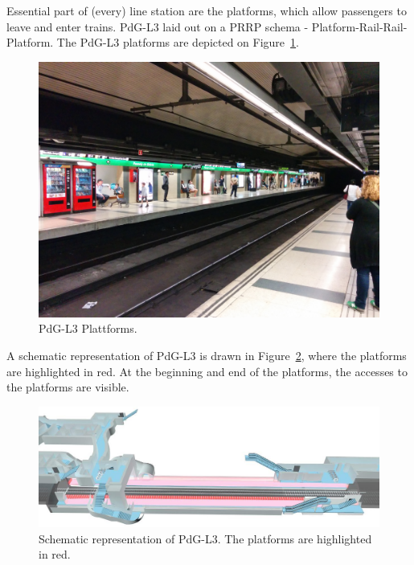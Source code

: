 Essential part of (every) line station are the platforms, which allow passengers to leave and enter trains. PdG-L3 laid out on a PRRP schema - Platform-Rail-Rail-Platform. The PdG-L3 platforms are depicted on Figure~\ref{fig:PdG-L3_platforms}.

\begin{figure}%
  \centering
  \includegraphics[width=\linewidth]{Figures/PdG-L3_platform.jpg} 
  \caption{PdG-L3 Plattforms. \cite{TMB_2014}}
  \label{fig:PdG-L3_platforms}
\end{figure}


A schematic representation of PdG-L3 is drawn in Figure~\ref{fig:PdG-L3_schematic}, where the platforms are highlighted in red. At the beginning and end of the platforms, the accesses to the platforms are visible.

\begin{figure}%
  \centering
  \includegraphics[width=\linewidth]{Figures/PdG-L3_schematic2.jpg} 
  \caption{Schematic representation of PdG-L3. The platforms are highlighted in red. \cite{TMB_2014}}
  \label{fig:PdG-L3_schematic}
\end{figure}


